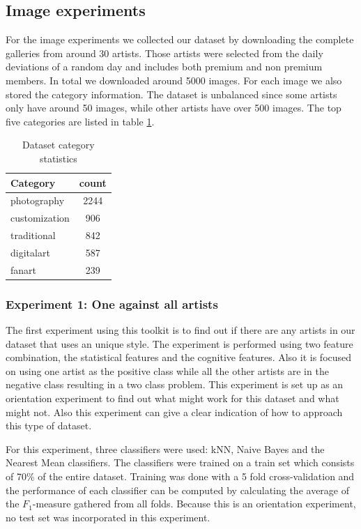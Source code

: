 \subsection{Image experiments}
For the image experiments we collected our dataset by downloading the complete galleries from around 30 artists.
Those artists were selected from the daily deviations of a random day and includes both premium and non premium members.
In total we downloaded around 5000 images. 
For each image we also stored the category information.
The dataset is unbalanced since some artists only have around 50 images, while other artists have over 500 images.
The top five categories are listed in table \ref{datasetstats}.

\begin{table}
    \centering
    \begin{tabular}
        { | l | c | } 
        \hline
        Category & count \\
        \hline
        photography & 2244 \\ 
        customization & 906 \\ 
        traditional & 842 \\ 
        digitalart & 587 \\ 
        fanart & 239 \\ 
        \hline 
    \end{tabular}
    \caption{Dataset category statistics}
    \label{datasetstats}
\end{table}

\subsubsection{Experiment 1: One against all artists}

The first experiment using this toolkit is to find out if there are any artists in our dataset that uses an unique style.
The experiment is performed using two feature combination, the statistical features and the cognitive features.
Also it is focused on using one artist as the positive class while all the other artists are in the negative class resulting in a two class problem.
This experiment is set up as an orientation experiment to find out what might work for this dataset and what might not.
Also this experiment can give a clear indication of how to approach this type of dataset.

For this experiment, three classifiers were used: kNN, Naive Bayes and the Nearest Mean classifiers.
The classifiers were trained on a train set which consists of 70\% of the entire dataset.
Training was done with a 5 fold cross-validation and the performance of each classifier can be computed by calculating the average of the $F_1$-measure gathered from all folds.
Because this is an orientation experiment, no test set was incorporated in this experiment.

